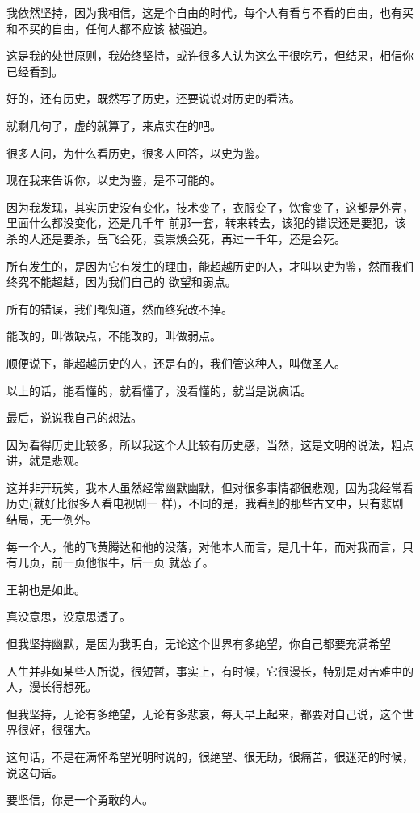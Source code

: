 \documentclass[11pt,a4paper,onecolumn]{article}
\begin{document}
我依然坚持，因为我相信，这是个自由的时代，每个人有看与不看的自由，也有买和不买的自由，任何人都不应该
被强迫。

这是我的处世原则，我始终坚持，或许很多人认为这么干很吃亏，但结果，相信你已经看到。

好的，还有历史，既然写了历史，还要说说对历史的看法。

就剩几句了，虚的就算了，来点实在的吧。

很多人问，为什么看历史，很多人回答，以史为鉴。

现在我来告诉你，以史为鉴，是不可能的。

因为我发现，其实历史没有变化，技术变了，衣服变了，饮食变了，这都是外壳，里面什么都没变化，还是几千年
前那一套，转来转去，该犯的错误还是要犯，该杀的人还是要杀，岳飞会死，袁崇焕会死，再过一千年，还是会死。

所有发生的，是因为它有发生的理由，能超越历史的人，才叫以史为鉴，然而我们终究不能超越，因为我们自己的
欲望和弱点。

所有的错误，我们都知道，然而终究改不掉。

能改的，叫做缺点，不能改的，叫做弱点。

顺便说下，能超越历史的人，还是有的，我们管这种人，叫做圣人。

以上的话，能看懂的，就看懂了，没看懂的，就当是说疯话。

最后，说说我自己的想法。

因为看得历史比较多，所以我这个人比较有历史感，当然，这是文明的说法，粗点讲，就是悲观。

这并非开玩笑，我本人虽然经常幽默幽默，但对很多事情都很悲观，因为我经常看历史(就好比很多人看电视剧一
样)，不同的是，我看到的那些古文中，只有悲剧结局，无一例外。

每一个人，他的飞黄腾达和他的没落，对他本人而言，是几十年，而对我而言，只有几页，前一页他很牛，后一页
就怂了。

王朝也是如此。

真没意思，没意思透了。

但我坚持幽默，是因为我明白，无论这个世界有多绝望，你自己都要充满希望

人生并非如某些人所说，很短暂，事实上，有时候，它很漫长，特别是对苦难中的人，漫长得想死。

但我坚持，无论有多绝望，无论有多悲哀，每天早上起来，都要对自己说，这个世界很好，很强大。

这句话，不是在满怀希望光明时说的，很绝望、很无助，很痛苦，很迷茫的时候，说这句话。

要坚信，你是一个勇敢的人。
\end{document}
